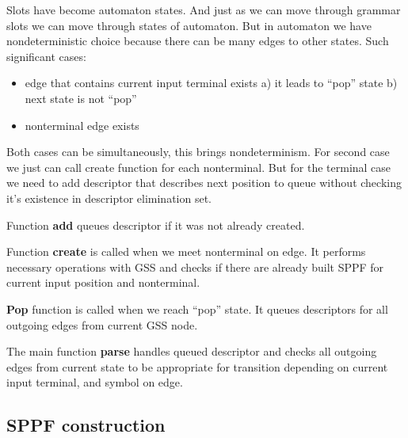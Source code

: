 \documentclass[runningheads,a4paper]{llncs}
\begin{document}
Slots have become automaton states. And just as we can move through grammar slots we can move through states 
of automaton. But in automaton we have nondeterministic choice because there can be many edges to other states.
Such significant cases:
\begin{itemize} 
\item edge that contains current input terminal exists
a) it leads to ``pop'' state
b) next state is not ``pop''
\item nonterminal edge exists 
\end{itemize}
Both cases can be simultaneously, this brings nondeterminism. For second case we just can call create function for each nonterminal. But for the terminal case we need to add descriptor that describes next position to queue without checking it's existence in descriptor elimination set.



Function \textbf{add} queues descriptor if it was not already created.

Function \textbf{create} is called when we meet nonterminal on edge.
It performs necessary operations with GSS and checks if there are already built SPPF for current
input position and nonterminal.

\textbf{Pop} function is called when we reach ``pop'' state. It queues descriptors for all outgoing edges from current GSS node.

The main function \textbf{parse} handles queued descriptor and checks all outgoing edges from current state to be appropriate
for transition depending on current input terminal, and symbol on edge.


\subsection{SPPF construction}
\end{document}

